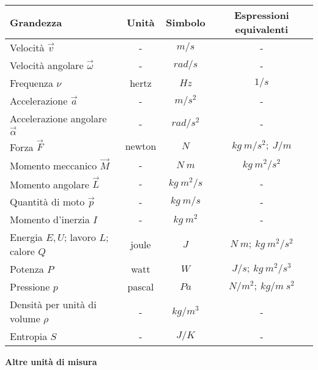 \documentclass[10pt,a4paper]{book}
\begin{document}
\begin{table}[!h]
	\centering
	\begin{tabular}{l|c|c|c}
		\hline
		\textbf{Grandezza} & \textbf{Unità} & \textbf{Simbolo} & \textbf{Espressioni equivalenti} \\
		\hline
		Velocità $\displaystyle \vec{v}$ & - & $\displaystyle m/s$ & - \\
		Velocità angolare $\displaystyle \vec{\omega }$ & - & $\displaystyle rad/s$ & - \\
		Frequenza $\displaystyle \nu $ & hertz & $\displaystyle Hz$ & $\displaystyle 1/s$ \\
		Accelerazione $\displaystyle \vec{a}$ & - & $\displaystyle m/s^2$ & - \\
		Accelerazione angolare $\displaystyle \vec{\alpha }$ & - & $\displaystyle rad/s^2$ & - \\
		Forza $\displaystyle \vec{F}$ & newton & $\displaystyle N$ & $\displaystyle kg\ m/s^2 ;\ J/m$ \\
		Momento meccanico $\displaystyle \vec{M}$ & - & $\displaystyle N\ m$ & $\displaystyle kg\ m^2 /s^2$ \\
		Momento angolare $\displaystyle \vec{L}$ & - & $\displaystyle kg\ m^2 /s$ & - \\
		Quantità di moto $\displaystyle \vec{p}$ & - & $\displaystyle kg\ m /s$ & - \\
		Momento d'inerzia $\displaystyle I$ & - & $\displaystyle kg\ m^2$ & - \\
		Energia $\displaystyle E,U$; lavoro $\displaystyle L$; calore $\displaystyle Q$ & joule & $\displaystyle J$ & $\displaystyle N\ m;\ kg\ m^2 /s^2$ \\
		Potenza $\displaystyle P$ & watt & $\displaystyle W$ & $\displaystyle J/s;\ kg\ m^2 /s^3$ \\
		Pressione $\displaystyle p$ & pascal & $\displaystyle Pa$ & $\displaystyle N/m^2 ;\ kg/m\ s^2$ \\
		Densità per unità di volume $\displaystyle \rho $ & - & $\displaystyle kg/m^3$ & - \\
		Entropia $\displaystyle S$ & - & $\displaystyle J/K$ & - \\
	\end{tabular}
\end{table}

\newpage

\begin{center}
	\textbf{Altre unità di misura}
\end{center}
\end{document}
